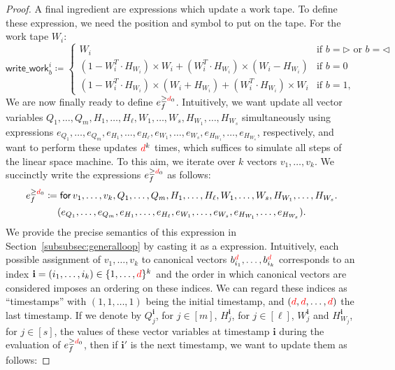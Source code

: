 \begin{proof}
    A final ingredient are expressions which update a work tape.
    To define these expression, we need the position and symbol to put on the tape. For the work tape $W_i$:
    $$
    \mathsf{write\_work}_b^i\coloneqq \begin{cases}
    W_i  & \text{if $b=\rhd$ or $b=\lhd$}\\
    (1-W_i^T\cdot H_{W_i})\times W_i + (W_i^T\cdot H_{W_i})\times (W_i-H_{W_i}) &\text{if $b=0$}\\
    (1-W_i^T\cdot H_{W_i})\times (W_i+H_{W_i}) + (W_i^T\cdot H_{W_i})\times W_i &\text{if $b=1$},
    \end{cases}
    $$
    We are now finally ready to define $e_f^{\geq {\color{red} d}_0}$. Intuitively, we want update all vector variables
	$Q_1,\ldots,\allowbreak Q_m,\allowbreak H_1,\ldots,H_\ell,W_1,\ldots,W_s, H_{W_1},\ldots,H_{W_s}$
	simultaneously using expressions $e_{Q_1},\ldots,e_{Q_m},\allowbreak e_{H_1},\allowbreak\ldots,\allowbreak e_{H_\ell},\allowbreak e_{W_1},\ldots,e_{W_s},e_{H_{W_1}},\ldots,e_{H_{W_s}}$, respectively, and want to perform these updates ${\color{red} d}^k$ times,
	which suffices to simulate all steps of the linear space machine. To this aim, we iterate over $k$ vectors $v_1,\ldots, v_k$.
	We succinctly write the expressions  $e_f^{\geq {\color{red} d}_0}$ as follows:
    \begin{multline*}
    e_f^{\geq {\color{red} d}_0}\coloneqq  \mathsf{for\,} v_1,\ldots,v_{k},Q_1,\ldots,Q_m,H_1,\ldots,H_\ell,W_1,\ldots,W_s, H_{W_1},\ldots,H_{W_s}. \\
    (e_{Q_1},\ldots,e_{Q_m},e_{H_1},\ldots,e_{H_\ell},e_{W_1},\ldots,e_{W_s},e_{H_{W_1}},\ldots,e_{H_{W_s}}).
    \end{multline*}
	We provide the precise semantics of this expression in Section~\ref{subsubsec:generalloop} by casting it as a \langfor expression.
	Intuitively, each possible assignment of $v_1,\ldots,v_k$ to canonical vectors $b_{i_1}^{{\color{red} d}},\ldots, b_{i_k}^{{\color{red} d}}$ corresponds to an index $\mathbf{i}=(i_1,\ldots,i_k)\in\{1,\ldots,{\color{red} d}\}^k$
	and the order in which canonical vectors are considered imposes an ordering on these indices. We can regard these indices as ``timestamps''
	with $(1,1,\ldots,1)$ being the initial timestamp, and $({\color{red} d},{\color{red} d},\ldots,{\color{red} d})$ the last timestamp.
		If we denote by $Q_j^{\mathbf{i}}$, for $j\in[m]$, $H_j^{\mathbf{i}}$, for $j\in[\ell]$, $W_j^{\mathbf{i}}$ and $H_{W_j}^{\mathbf{i}}$, for $j\in[s]$, the values of these vector variables at timestamp $\mathbf{i}$ during the evaluation of $e_f^{\geq {\color{red} d}_0}$, then if $\mathbf{i}'$ is the next timestamp, we want to update them as follows:

\end{proof}
